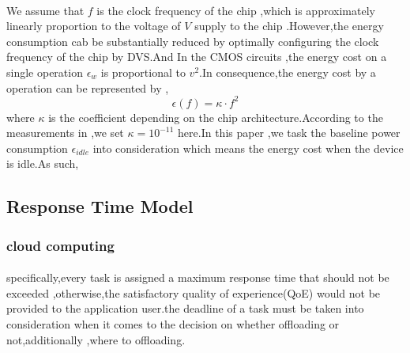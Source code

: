\documentclass[review]{elsarticle}
\begin{document}
             \paragraph{} We assume that \begin{math} f \end{math} is the clock frequency of the chip ,which is approximately linearly proportion to the voltage of \begin{math} V \end{math} supply to the chip .However,the energy consumption cab be substantially reduced by optimally configuring the clock frequency of the chip by DVS\citep{rabaey2002digital}.And In the CMOS circuits\citep{wen2012energy} ,the energy cost on a single operation \begin{math} \epsilon_w \end{math} is proportional to \begin{math} {v^2} \end{math}.In consequence,the energy cost by a operation can be represented by ,\\
             $$ \epsilon(f)=\kappa\cdot{f^2}$$
             where \begin{math}\kappa \end{math} is the coefficient depending on the chip architecture.According to the measurements in \citep{miettinen2010energy} ,we set  \begin{math} \kappa=10^{-11} \end{math} here.In this paper ,we task the baseline power consumption \begin{math} \epsilon_{idle}\end{math} into consideration which means the energy cost when the device is idle.As such,
            
        
        \subsection{Response Time Model}    
            \subsubsection{cloud computing}
            \paragraph{} specifically,every task is assigned a maximum response time that should not be exceeded ,otherwise,the satisfactory quality of experience(QoE) would not be provided to the application user.the deadline of a task must be taken into consideration when it comes to the decision on whether offloading or not,additionally ,where to offloading.
\end{document}
